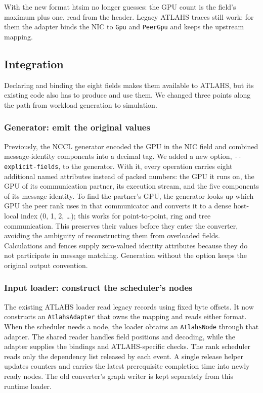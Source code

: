 \documentclass[10pt,a4paper]{article}
\begin{document}
With the new format htsim no longer guesses: the GPU count is the field's maximum plus one, read from the header. Legacy ATLAHS traces still work: for them the adapter binds the NIC to \texttt{Gpu} and \texttt{PeerGpu} and keeps the upstream mapping.

\hypertarget{integration}{}
\subsection{Integration}

Declaring and binding the eight fields makes them available to ATLAHS, but its existing code also has to produce and use them. We changed three points along the path from workload generation to simulation.

\hypertarget{generator-emit-the-original-values}{}
\subsubsection{Generator: emit the original values}

Previously, the NCCL generator encoded the GPU in the NIC field and combined message-identity components into a decimal tag. We added a new option, \texttt{-\allowbreak{}-\allowbreak{}explicit-\allowbreak{}fields}, to the generator. With it, every operation carries eight additional named attributes instead of packed numbers: the GPU it runs on, the GPU of its communication partner, its execution stream, and the five components of its message identity. To find the partner's GPU, the generator looks up which GPU the peer rank uses in that communicator and converts it to a dense host-local index (0, 1, 2, \ldots); this works for point-to-point, ring and tree communication. This preserves their values before they enter the converter, avoiding the ambiguity of reconstructing them from overloaded fields. Calculations and fences supply zero-valued identity attributes because they do not participate in message matching. Generation without the option keeps the original output convention.

\hypertarget{input-loader-construct-the-schedulers-nodes}{}
\subsubsection{Input loader: construct the scheduler's nodes}

The existing ATLAHS loader read legacy records using fixed byte offsets. It now constructs an \texttt{AtlahsAdapte\allowbreak{}r} that owns the mapping and reads either format. When the scheduler needs a node, the loader obtains an \texttt{AtlahsNode} through that adapter. The shared reader handles field positions and decoding, while the adapter supplies the bindings and ATLAHS-specific checks. The rank scheduler reads only the dependency list released by each event. A single release helper updates counters and carries the latest prerequisite completion time into newly ready nodes. The old converter's graph writer is kept separately from this runtime loader.
\end{document}
